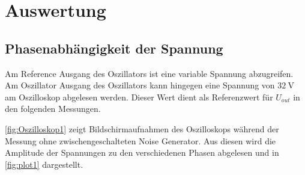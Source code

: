 \section{Auswertung}
\label{sec:Auswertung}

\subsection{Phasenabhängigkeit der Spannung} %
\label{sub:Phasenabhängigkeit der Spannung}


Am Reference Ausgang des Oszillators ist eine variable Spannung abzugreifen. Am Oszillator Ausgang des Oszillators kann hingegen eine Spannung von $\qty{32}{\volt}$
am Oszilloskop abgelesen werden.
Dieser Wert dient als Referenzwert für $U_{out}$ in den folgenden Messungen.

\autoref{fig:Oszilloskop1} zeigt Bildschirmaufnahmen des Oszilloskops während der Messung ohne zwischengeschalteten Noise Generator. Aus diesen wird die 
Amplitude der Spannungen zu den verschiedenen Phasen abgelesen und in \autoref{fig:plot1} dargestellt.

